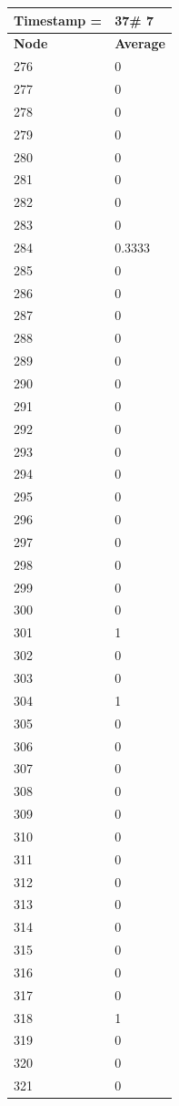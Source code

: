 \begin{tabular}{|l||l|}
\hline
\textbf{Timestamp =} & \textbf{37}\# 7\\\hline
	\textbf{Node} & \textbf{Average} \\ \hline
\hline
	276 & 0 \\ \hline
	277 & 0 \\ \hline
	278 & 0 \\ \hline
	279 & 0 \\ \hline
	280 & 0 \\ \hline
	281 & 0 \\ \hline
	282 & 0 \\ \hline
	283 & 0 \\ \hline
	284 & 0.3333 \\ \hline
	285 & 0 \\ \hline
	286 & 0 \\ \hline
	287 & 0 \\ \hline
	288 & 0 \\ \hline
	289 & 0 \\ \hline
	290 & 0 \\ \hline
	291 & 0 \\ \hline
	292 & 0 \\ \hline
	293 & 0 \\ \hline
	294 & 0 \\ \hline
	295 & 0 \\ \hline
	296 & 0 \\ \hline
	297 & 0 \\ \hline
	298 & 0 \\ \hline
	299 & 0 \\ \hline
	300 & 0 \\ \hline
	301 & 1 \\ \hline
	302 & 0 \\ \hline
	303 & 0 \\ \hline
	304 & 1 \\ \hline
	305 & 0 \\ \hline
	306 & 0 \\ \hline
	307 & 0 \\ \hline
	308 & 0 \\ \hline
	309 & 0 \\ \hline
	310 & 0 \\ \hline
	311 & 0 \\ \hline
	312 & 0 \\ \hline
	313 & 0 \\ \hline
	314 & 0 \\ \hline
	315 & 0 \\ \hline
	316 & 0 \\ \hline
	317 & 0 \\ \hline
	318 & 1 \\ \hline
	319 & 0 \\ \hline
	320 & 0 \\ \hline
	321 & 0 \\ \hline
\end{tabular}
